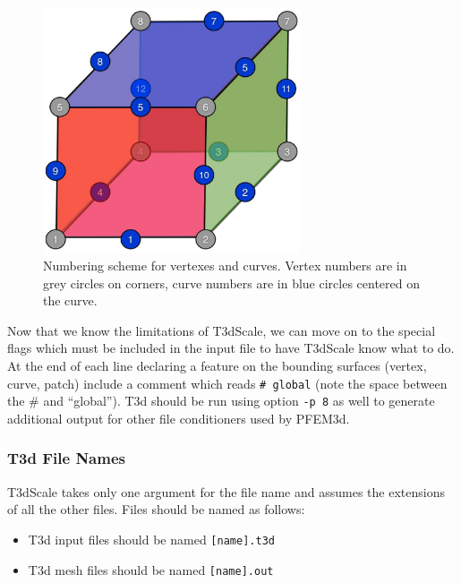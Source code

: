 \documentclass{article}
\begin{document}
\begin{figure}
\center
\includegraphics[width=3in]{Numbering}
\caption[8pt]{Numbering scheme for vertexes and curves.  Vertex
  numbers are in grey circles on corners, curve numbers are in blue
  circles centered on the curve.}
\label{fig:numbering}
\end{figure}

Now that we know the limitations of T3dScale, we can move on to the
special flags which must be included in the input file to have
T3dScale know what to do.  At the end of each line declaring a feature
on the bounding surfaces (vertex, curve, patch) include a comment
which reads \verb|# global| (note the space between the \# and
``global'').  T3d should be run using option \verb|-p 8| as well to
generate additional output for other file conditioners used by PFEM3d.

\subsubsection{T3d File Names}
T3dScale takes only one argument for the file name and assumes the
extensions of all the other files.  Files should be named as follows:
\begin{itemize}
\item T3d input files should be named \verb|[name].t3d|
\item T3d mesh files should be named \verb|[name].out|
\end{itemize}
\end{document}
